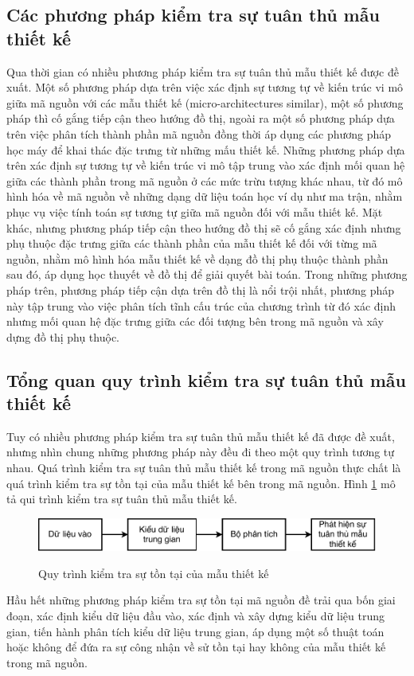 \documentclass[12pt]{report}
\begin{document}
\subsection{Các phương pháp kiểm tra sự tuân thủ mẫu thiết kế}
Qua thời gian có nhiều phương pháp kiểm tra sự tuân thủ mẫu thiết kế được đề xuất. Một số phương pháp dựa trên việc xác định sự tương tự về kiến trúc vi mô giữa mã nguồn với các mẫu thiết kế (micro-architectures similar), một số phương pháp thì cố gắng tiếp cận theo hướng đồ thị, ngoài ra một số phương pháp dựa trên việc phân tích thành phần mã nguồn đồng thời áp dụng các phương pháp học máy để khai thác đặc trưng từ những mấu thiết kế. Những phương pháp dựa trên xác định sự tương tự về kiến trúc vi mô tập trung vào xác định mối quan hệ giữa các thành phần trong mã nguồn ở các mức trừu tượng khác nhau, từ đó mô hình hóa về mã nguồn về những dạng dữ liệu toán học ví dụ như ma trận, nhằm phục vụ việc tính toán sự tương tự giữa mã nguồn đối với mẫu thiết kế.
Mặt khác, nhưng phương pháp tiếp cận theo hướng đồ thị sẽ cố gắng xác định nhưng phụ thuộc đặc trưng giữa các thành phần của mẫu thiết kế đối với từng mã nguồn, nhằm mô hình hóa mẫu thiết kế về dạng đồ thị phụ thuộc thành phần sau đó, áp dụng học thuyết về đồ thị để giải quyết bài toán. Trong những phương pháp trên, phương pháp tiếp cận dựa trên đồ thị là nổi trội nhất, phương pháp này tập trung vào việc phân tích tĩnh cấu trúc của chương trình từ đó xác định nhưng mối quan hệ đặc trưng giữa các đối tượng bên trong mã nguồn và xây dựng đồ thị phụ thuộc.

\subsection{Tổng quan quy trình kiểm tra sự tuân thủ mẫu thiết kế}
Tuy có nhiều phương pháp kiểm tra sự tuân thủ mẫu thiết kế đã được đề xuất, nhưng nhìn chung những phương pháp này đều đi theo một quy trình tương tự nhau. Quá trình kiểm tra sự tuân thủ mẫu thiết kế trong mã nguồn thực chất là quá trình kiểm tra sự tồn tại của mẫu thiết kế bên trong mã nguồn.
Hình \ref{fig:ddp_process} mô tả qui trình kiểm tra sự tuân thủ mẫu thiết kế.
\begin{figure}[h]
	\centering
	\includegraphics[scale=0.3]{images/ddp}
	\label{fig:ddp_process}
	\caption{Quy trình kiểm tra sự tồn tại của mẫu thiết kế}
\end{figure}
Hầu hết những phương pháp kiểm tra sự tồn tại mã nguồn đề trải qua bốn giai đoạn, xác định kiểu dữ liệu đầu vào, xác định và xây dựng kiểu dữ liệu trung gian, tiến hành phân tích kiểu dữ liệu trung gian, áp dụng một số thuật toán hoặc không để đứa ra sự công nhận về sử tồn tại hay không của mẫu thiết kế trong mã nguồn.
\end{document}
